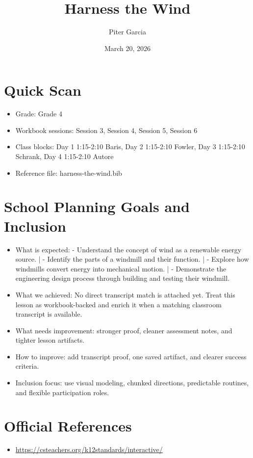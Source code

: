 \documentclass[11pt]{article}
\title{Harness the Wind}
\author{Piter Garcia}
\date{March 20, 2026}
\begin{document}
\maketitle
\section*{Quick Scan}
\begin{itemize}[leftmargin=*]
\item Grade: Grade 4
\item Workbook sessions: Session 3, Session 4, Session 5, Session 6
\item Class blocks: Day 1 1:15-2:10 Baris, Day 2 1:15-2:10 Fowler, Day 3 1:15-2:10 Schrank, Day 4 1:15-2:10 Autore
\item Reference file: harness-the-wind.bib
\end{itemize}
\section*{School Planning Goals and Inclusion}
\begin{itemize}[leftmargin=*]
\item What is expected: - Understand the concept of wind as a renewable energy source. | - Identify the parts of a windmill and their function. | - Explore how windmills convert energy into mechanical motion. | - Demonstrate the engineering design process through building and testing their windmill.
\item What we achieved: No direct transcript match is attached yet. Treat this lesson as workbook-backed and enrich it when a matching classroom transcript is available.
\item What needs improvement: stronger proof, cleaner assessment notes, and tighter lesson artifacts.
\item How to improve: add transcript proof, one saved artifact, and clearer success criteria.
\item Inclusion focus: use visual modeling, chunked directions, predictable routines, and flexible participation roles.
\end{itemize}
\section*{Official References}
\begin{itemize}[leftmargin=*]
\item \url{https://csteachers.org/k12standards/interactive/}

\end{itemize}
\end{document}
